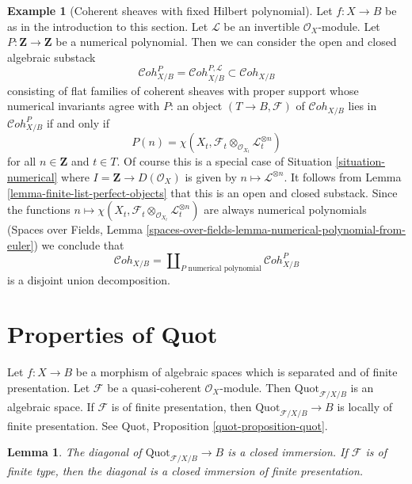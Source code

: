 \documentclass{stacks-project}
\theoremstyle{plain}
\newtheorem{lemma}[subsection]{Lemma}
\theoremstyle{definition}
\newtheorem{example}[subsection]{Example}
\theoremstyle{remark}
\numberwithin{equation}{subsection}
\def\Cohstack{\mathcal{C}\!\mathit{oh}}
\def\Quotfunctor{\mathrm{Quot}}
\begin{document}
\begin{example}[Coherent sheaves with fixed Hilbert polynomial]
\label{example-hilbert-polynomial}
Let $f : X \to B$ be as in the introduction to this section.
Let $\mathcal{L}$ be an invertible $\mathcal{O}_X$-module.
Let $P : \mathbf{Z} \to \mathbf{Z}$ be a numerical polynomial.
Then we can consider the open and closed algebraic substack
$$
\Cohstack^P_{X/B} =
\Cohstack^{P, \mathcal{L}}_{X/B}
\subset \Cohstack_{X/B}
$$
consisting of flat families of coherent sheaves with proper support
whose numerical invariants agree with $P$: an object
$(T \to B, \mathcal{F})$ of $\Cohstack_{X/B}$ lies in
$\Cohstack^P_{X/B}$ if and only if
$$
P(n) =
\chi(X_t, \mathcal{F}_t \otimes_{\mathcal{O}_{X_t}} \mathcal{L}_t^{\otimes n})
$$
for all $n \in \mathbf{Z}$ and $t \in T$. Of course this is a
special case of Situation \ref{situation-numerical}
where $I = \mathbf{Z} \to D(\mathcal{O}_X)$ is given by
$n \mapsto \mathcal{L}^{\otimes n}$. It follows from
Lemma \ref{lemma-finite-list-perfect-objects}
that this is an open and closed substack. Since the functions
$n \mapsto
\chi(X_t, \mathcal{F}_t \otimes_{\mathcal{O}_{X_t}} \mathcal{L}_t^{\otimes n})$
are always numerical polynomials (Spaces over Fields, Lemma
\ref{spaces-over-fields-lemma-numerical-polynomial-from-euler})
we conclude that
$$
\Cohstack_{X/B} = \coprod\nolimits_{P\text{ numerical polynomial}}
\Cohstack^P_{X/B}
$$
is a disjoint union decomposition.
\end{example}







\section{Properties of Quot}
\label{section-quot}

\noindent
Let $f : X \to B$ be a morphism of algebraic spaces which is
separated and of finite presentation. Let $\mathcal{F}$ be a
quasi-coherent $\mathcal{O}_X$-module. Then
$\Quotfunctor_{\mathcal{F}/X/B}$ is an algebraic space.
If $\mathcal{F}$ is of finite presentation, then
$\Quotfunctor_{\mathcal{F}/X/B} \to B$ is locally of finite
presentation. See Quot, Proposition \ref{quot-proposition-quot}.

\begin{lemma}
\label{lemma-quot-diagonal-closed}
The diagonal of $\Quotfunctor_{\mathcal{F}/X/B} \to B$ is a closed immersion.
If $\mathcal{F}$ is of finite type, then the diagonal is a closed
immersion of finite presentation.
\end{lemma}
\end{document}
